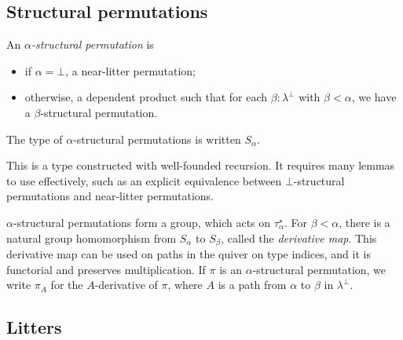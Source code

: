 \documentclass{article}
\begin{document}
\subsection{Structural permutations}

\begin{definition}
    An \emph{\( \alpha \)-structural permutation} is
    \begin{itemize}
        \item if \( \alpha = \bot \), a near-litter permutation;
        \item otherwise, a dependent product such that for each \( \beta : \lambda^\bot \) with \( \beta < \alpha \), we have a \( \beta \)-structural permutation.
    \end{itemize}
    The type of \( \alpha \)-structural permutations is written \( S_\alpha \).
\end{definition}
\begin{remark}
    This is a type constructed with well-founded recursion.
    It requires many lemmas to use effectively, such as an explicit equivalence between \( \bot \)-structural permutations and near-litter permutations.
\end{remark}
\begin{lemma}
    \( \alpha \)-structural permutations form a group, which acts on \( \tau_\alpha^\star \).
    For \( \beta < \alpha \), there is a natural group homomorphism from \( S_\alpha \) to \( S_\beta \), called the \emph{derivative map}.
    This derivative map can be used on paths in the quiver on type indices, and it is functorial and preserves multiplication.
    If \( \pi \) is an \( \alpha \)-structural permutation, we write \( \pi_A \) for the \( A \)-derivative of \( \pi \), where \( A \) is a path from \( \alpha \) to \( \beta \) in \( \lambda^\bot \).
\end{lemma}

\subsection{Litters}
\end{document}
